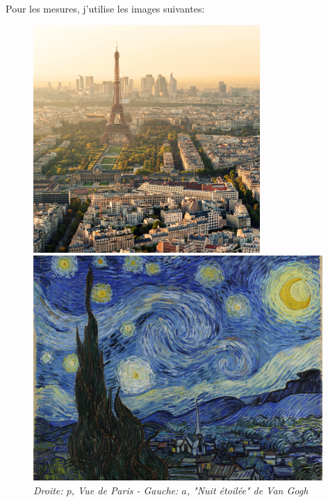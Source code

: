 \documentclass{article}
\begin{document}
\paragraph*{}
Pour les mesures, j'utilise les images suivantes:
\begin{figure}[!htb]
\centering
\begin{minipage}{0.5\textwidth}
\centering
\includegraphics[width=0.77\textwidth]{../Images/paris.jpg}
\end{minipage}%
\begin{minipage}{0.5\textwidth}
\centering
\includegraphics[width=0.98\textwidth]{../Images/starry_night.jpg}
\end{minipage}
\label{fig:paris_starrynight}
\caption{\textit{Droite: $p$, Vue de Paris - Gauche: $a$, "Nuit étoilée" de Van Gogh}}
\end{figure}
\end{document}
